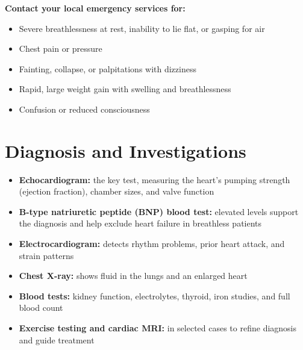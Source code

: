 \textbf{Contact your local emergency services for:}
\begin{itemize}
    \item Severe breathlessness at rest, inability to lie flat, or gasping for air
    \item Chest pain or pressure
    \item Fainting, collapse, or palpitations with dizziness
    \item Rapid, large weight gain with swelling and breathlessness
    \item Confusion or reduced consciousness
\end{itemize}

\section*{Diagnosis and Investigations}
\begin{itemize}
    \item \textbf{Echocardiogram:} the key test, measuring the heart's pumping strength (ejection fraction), chamber sizes, and valve function
    \item \textbf{B-type natriuretic peptide (BNP) blood test:} elevated levels support the diagnosis and help exclude heart failure in breathless patients
    \item \textbf{Electrocardiogram:} detects rhythm problems, prior heart attack, and strain patterns
    \item \textbf{Chest X-ray:} shows fluid in the lungs and an enlarged heart
    \item \textbf{Blood tests:} kidney function, electrolytes, thyroid, iron studies, and full blood count
    \item \textbf{Exercise testing and cardiac MRI:} in selected cases to refine diagnosis and guide treatment
\end{itemize}

